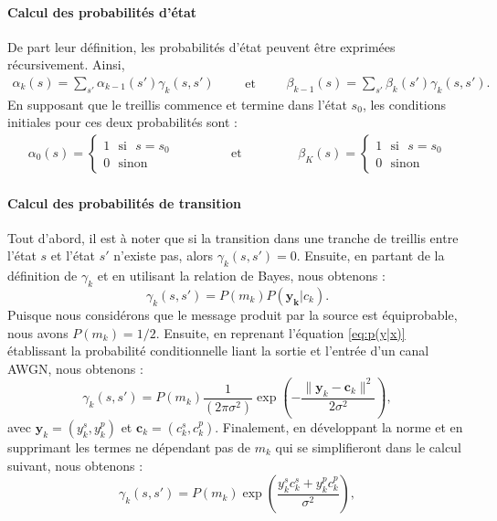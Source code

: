 \paragraph*{Calcul des probabilités d'état}
De part leur définition, les probabilités d'état peuvent être exprimées récursivement. Ainsi, 
\begin{equation}	\begin{split}
	\alpha_k(s)=\sum\limits_{s'}\alpha_{k-1}(s')\gamma_k(s,s')
	\end{split}\qquad\text{et}\qquad
	\begin{split}
		\beta_{k-1}(s)=\sum\limits_{s'}\beta_{k}(s')\gamma_k(s,s').
	\end{split} 
\end{equation}
En supposant que le treillis commence et termine dans l'état $s_0$, les conditions initiales pour ces deux probabilités sont : 
\[
	\begin{split}
		\alpha_0(s)=\begin{cases}
		1 \text{~~si~~} s = s_0 \\
		0 \text{~~sinon~~}
		\end{cases}
	\end{split}\qquad\qquad\text{et}\qquad\qquad
	\begin{split}
		\beta_K(s)=\begin{cases}
		1 \text{~~si~~} s = s_0 \\
		0 \text{~~sinon~~}
		\end{cases}
	\end{split}
\]
			
\paragraph*{Calcul des probabilités de transition} Tout d'abord, il est à noter que si la transition dans une tranche de treillis entre l'état $s$ et l'état $s'$ n'existe pas, alors $\gamma_k(s,s')=0.$
Ensuite, en partant de la définition de $\gamma_k$ et en utilisant la relation de Bayes, nous obtenons : 
\[\gamma_k(s,s') = P(m_k)P(\mathbf{y_k}|{c_k}).\]
Puisque nous considérons que le message produit par la source est équiprobable, nous avons $P(m_k) = 1/2$. Ensuite, en reprenant l'équation \ref{eq:p(y|x)} établissant la probabilité conditionnelle liant la sortie et l'entrée d'un canal AWGN, nous obtenons : 
\begin{equation*}
	\gamma_k(s,s') = P(m_k)\frac{1}{(2\pi\sigma^2)} \exp \left(-\frac{\|\mathbf{y}_k-\mathbf{c}_k\|^2}{2 \sigma^2}\right),
\end{equation*}
avec $\mathbf{y}_k = (y^s_k, y^p_k)$ et $\mathbf{c}_k = (c^s_k, c^p_k)$. Finalement, en développant la norme et en supprimant les termes ne dépendant pas de $m_k$ qui se simplifieront dans le calcul suivant, nous obtenons : 
\begin{equation}	\label{eq:llr}
	\gamma_k(s,s') = P(m_k) \exp \left(\frac{y^s_k c^s_k + y^p_k c^p_k}{\sigma^2}\right),
\end{equation}

